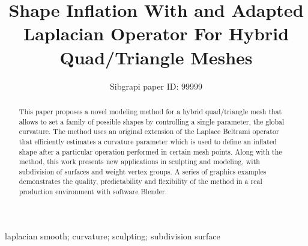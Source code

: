 \documentclass[10pt, conference]{IEEEtran}
\begin{document}
\title{Shape Inflation With and Adapted Laplacian Operator For Hybrid Quad/Triangle Meshes}

\newif\iffinal
\finalfalse
\newcommand{\jemsid}{99999}

\iffinal
  \author{%
    \IEEEauthorblockN{Alexander Pinzon, Eduardo Romero}
    \IEEEauthorblockA{%
      Cimalab Research Group\\
      Universidad Nacional de Colombia\\
      Bogota-Colombia\\
      Email: apinzonf@unal.edu.co, edromero@unal.edu.co }
  }
\else
  \author{Sibgrapi paper ID: \jemsid \\ }
\fi


\maketitle

\begin{abstract}
This paper proposes a novel modeling method for a hybrid quad/triangle
mesh that allows to set a family of possible shapes by controlling
a single parameter, the global curvature. The method uses an original
extension of the Laplace Beltrami operator that efficiently estimates
a curvature parameter which is used to define an inflated shape after
a particular operation performed in certain mesh points. Along with
the method, this work presents new applications in sculpting and modeling,
with subdivision of surfaces and weight vertex groups. A series of
graphics examples demonstrates the quality, predictability and flexibility
of the method in a real production environment with software Blender.

\end{abstract}

\begin{IEEEkeywords}
laplacian smooth; curvature; sculpting; subdivision surface

\end{IEEEkeywords}
\end{document}
